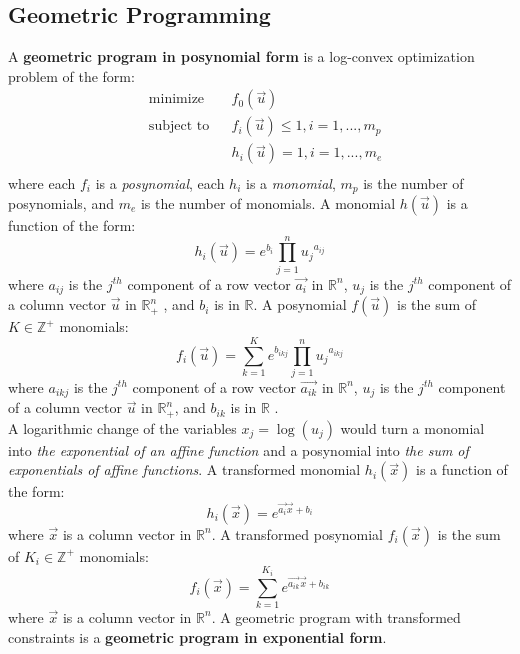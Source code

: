 \subsection{Geometric Programming}
A \textbf{geometric program in posynomial form} is a log-convex optimization problem of the form:
\begin{equation}
\begin{aligned}
	& \text{minimize} && f_0 \left(\vec{u}\right) \\
	& \text{subject to} && f_i \left(\vec{u}\right) \leq 1, i = 1,...,m_p\\
	& && h_i \left(\vec{u}\right) = 1, i = 1, ...,m_e\\
\end{aligned}
\label{GP_standard}
\end{equation}
where each $f_i$ is a {\em posynomial}, each $h_i$ is a {\em monomial}, $m_p$ is the number of posynomials, and $m_e$ is the number of monomials. A monomial $h(\vec{u})$ is a function of the form:
\begin{displaymath}
	h_i(\vec{u}) = e^{b_i}\textstyle{\prod}_{j=1}^{n}{u_j}^{a_{ij}}
\end{displaymath}
where $a_{ij}$ is the $j^{th}$ component of a row vector $\vec{a_i}$ in $\mathbb{R}^n$, $u_j$ is the $j^{th}$ component of a column vector $\vec{u}$ in $\mathbb{R}^n_+$ , and $b_i$ is in $\mathbb{R}$. A posynomial $f(\vec{u})$ is the sum of $K \in \mathbb{Z}^+$ monomials:
\begin{displaymath}
	f_i(\vec{u}) = \textstyle{\sum_{k=1}^{K}}e^{b_{ikj}}\prod_{j=1}^{n}{u_j}^{a_{ikj}}
\end{displaymath}
where $a_{ikj}$ is the $j^{th}$ component of a row vector $\vec{a_{ik}}$ in $\mathbb{R}^n$, $u_j$ is the $j^{th}$ component of a column vector $\vec{u}$ in $\mathbb{R}^n_+$, and $b_{ik}$ is in $\mathbb{R}$ \cite{Boyd2007}.\\
A logarithmic change of the variables $x_j = \log(u_j)$ would turn a monomial into {\em  the exponential of an affine function} and a posynomial into {\em the sum of exponentials of affine functions}. A transformed monomial $h_i(\vec{x})$ is a function of the form:
\begin{displaymath}
    h_i(\vec{x}) = e^{\vec{a_i}\vec{x} + b_i}
\end{displaymath}
where $\vec{x}$ is a column vector in $\mathbb{R}^n$. A transformed posynomial $f_i(\vec{x})$ is the sum of $K_i \in \mathbb{Z}^+$ monomials:
\begin{displaymath}
    f_i(\vec{x}) = \textstyle{\sum_{k=1}^{K_i}}e^{\vec{a_{ik}}\vec{x} + b_{ik}}
\end{displaymath}
where $\vec{x}$ is a column vector in $\mathbb{R}^n$. A geometric program with transformed constraints is a \textbf{geometric program in exponential form}.


